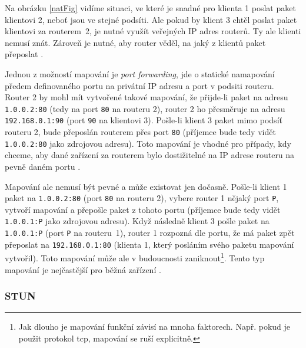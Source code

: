 Na obrázku \ref{natFig} vidíme situaci, ve které je snadné pro klienta 1 poslat
paket klientovi 2, neboť jsou ve stejné podsíti. Ale pokud by klient 3 chtěl
poslat paket klientovi za routerem~2, je nutné využít veřejných IP adres
routerů. Ty ale klienti nemusí znát. Zároveň je nutné, aby router věděl, na jaký
z klientů paket přeposlat \parencite{WebRTCForTheCurious}.

Jednou z možností mapování je \textit{port forwarding}, jde o statické
namapování předem definovaného portu na privátní IP adresu a port v podsiti
routeru. Router 2 by mohl mít vytvořené takové mapování, že přijde-li paket na
adresu \texttt{1.0.0.2:80} (tedy na port \texttt{80} na
routeru 2), router 2 ho přesměruje na adresu \texttt{192.168.0.1:90}
(port \texttt{90} na klientovi 3). Pošle-li klient 3 paket mimo podsíť
routeru 2, bude přeposlán routerem přes port \texttt{80} (příjemce
bude tedy vidět \texttt{1.0.0.2:80} jako zdrojovou adresu). Toto
mapování je vhodné pro případy, kdy chceme, aby dané zařízení za routerem bylo
dostižitelné na IP adrese routeru na pevně daném portu
\parencite{G2-WhatIsPortForwarding}.

Mapování ale nemusí být pevné a může existovat jen dočasně. Pošle-li klient 1
paket na \texttt{1.0.0.2:80} (port \texttt{80} na routeru
2), vybere router 1 nějaký port \texttt{P}, vytvoří mapování a
přepošle paket z tohoto portu (příjemce bude tedy vidět
\texttt{1.0.0.1:P} jako zdrojovou adresu). Když následně klient 3
pošle paket na \texttt{1.0.0.1:P} (port \texttt{P} na
routeru~1), router 1 rozpozná dle portu, že má paket zpět přeposlat na
\texttt{192.168.0.1:80} (klienta 1, který posláním svého paketu
mapování vytvořil). Toto mapování může ale v budoucnosti zaniknout\footnote{Jak
    dlouho je mapování funkční závisí na mnoha faktorech. Např. pokud je použit
    protokol \gls{tcp}, mapování se ruší explicitně.}. Tento typ mapování je
nejčastější pro běžná zařízení \parencite{WebRTCForTheCurious}.

\subsubsection{STUN}\label{stun}

